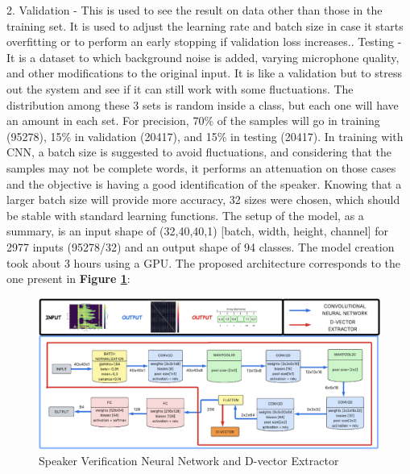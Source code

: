 2. Validation - This is used to see the result on data other than those in the training set. It is used to adjust the learning rate and batch size in case it starts overfitting or to perform an early stopping if validation loss increases.. Testing - It is a dataset to which background noise is added, varying microphone quality, and other modifications to the original input. It is like a validation but to stress out the system and see if it can still work with some fluctuations.\newline\newline
The distribution among these 3 sets is random inside a class, but each one will have an amount in each set. For precision, 70\% of the samples will go in training (95278), 15\% in validation (20417), and 15\% in testing (20417). In training with CNN, a batch size is suggested to avoid fluctuations, and considering that the samples may not be complete words, it performs an attenuation on those cases and the objective is having a good identification of the speaker. Knowing that a larger batch size will provide more accuracy, 32 sizes were chosen, which should be stable with standard learning functions. The setup of the model, as a summary, is an input shape of (32,40,40,1) [batch, width, height, channel] for 2977 inputs (95278/32) and an output shape of 94 classes. The model creation took about 3 hours using a GPU. The proposed architecture\cite{dvector_extractor_TinySV} corresponds to the one present in \textbf{Figure \ref{fig:speaker verification dvector extractor}}:
\begin{center}
    \begin{figure}[!h]
        \centering
        \includegraphics[width=1.0\textwidth]{images/3.02 D-vector Extractor.png}
        \caption{Speaker Verification Neural Network and D-vector Extractor}
        \label{fig:speaker verification dvector extractor}
    \end{figure}
\end{center}

